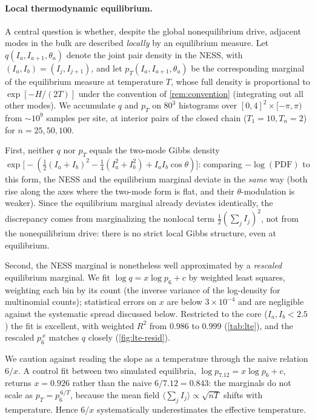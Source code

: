 \documentclass[11pt,a4paper]{article}
\theoremstyle{definition}
\numberwithin{equation}{section}   %
\begin{document}
\paragraph{Local thermodynamic equilibrium.}\label{par:lte}
A central question is whether, despite the global nonequilibrium drive,
adjacent modes in the bulk are described \emph{locally} by an equilibrium
measure. Let $q(I_a,I_{a+1},\theta_a)$ denote the joint pair density in the
NESS, with $(I_a,I_b)=(I_j,I_{j+1})$, and let
$p_T(I_a,I_{a+1},\theta_a)$ be the corresponding marginal of the equilibrium
measure at temperature $T$, whose full density is proportional to
$\exp[-H/(2T)]$ under the convention of \cref{rem:convention} (integrating out
all other modes). We accumulate $q$ and $p_T$ on
$80^3$ histograms over $[0,4]^2\times[-\pi,\pi)$ from $\sim10^9$ samples per
site, at interior pairs of the closed chain ($T_1=10,T_n=2$) for
$n=25,50,100$.

First, neither $q$ nor $p_T$ equals the two-mode Gibbs density
$\exp\!\big[-(\tfrac12(I_a{+}I_b)^2-\tfrac14(I_a^2{+}I_b^2)+I_aI_b\cos\theta)\big]$:
comparing $-\log(\text{PDF})$ to this form, the NESS and the equilibrium
marginal deviate in the \emph{same} way (both rise along the axes where the
two-mode form is flat, and their $\theta$-modulation is weaker). Since the
equilibrium marginal already deviates identically, the discrepancy comes from
marginalizing the nonlocal term $\tfrac12(\sum_j I_j)^2$, not from the
nonequilibrium drive: there is no strict local Gibbs structure, even at
equilibrium.

Second, the NESS marginal is nonetheless well approximated by a
\emph{rescaled} equilibrium marginal. We fit $\log q = x\log p_6 + c$ by
weighted least squares, weighting each bin by its count (the inverse variance
of the log-density for multinomial counts); statistical errors on $x$ are
below $3\times10^{-4}$ and are negligible against the systematic spread
discussed below. Restricted to the core ($I_a,I_b<2.5$) the fit is excellent,
with weighted $R^2$ from $0.986$ to $0.999$ (\cref{tab:lte}), and the rescaled
$p_6^{\,x}$ matches $q$ closely (\cref{fig:lte-resid}).

We caution against reading the slope as a temperature through the naive
relation $6/x$. A control fit between two simulated equilibria,
$\log p_{7.12}=x\log p_6+c$, returns $x=0.926$ rather than the naive
$6/7.12=0.843$: the marginals do not scale as $p_T=p_6^{\,6/T}$,
because the mean field $\langle\sum_j I_j\rangle\propto\sqrt{nT}$ shifts with
temperature. Hence $6/x$ systematically underestimates the effective
temperature.
\end{document}

